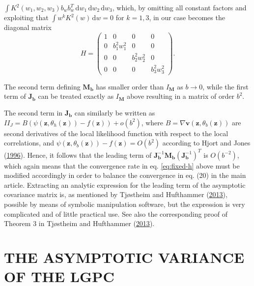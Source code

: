 \documentclass[
  12pt,
  letterpaper]{article}
\numberwithin{equation}{section}
\newcommand{\z}{\bm{z}}
\newcommand{\fv}{\bm{v}}
\newcommand{\hh}{\bm{b}}
\newcommand{\Jb}{\bm{J}_{\hh}}
\newcommand{\Mb}{\bm{M}_{\hh}}
\begin{document}
\noindent \(\int K^2(w_1, w_2, w_3)b_wb_w^T\,\textrm{d}w_1\,\textrm{d}w_2\,\textrm{d}w_3\), which, by omitting all constant factors and exploiting that \(\int w^k K^2(w)\,\textrm{d}w = 0\) for \(k = 1,3\), in our case becomes the diagonal matrix
\[H = \begin{pmatrix} 1 & 0 & 0 & 0 \\ 0 & b_1^2w_1^2 & 0 & 0 \\ 0 & 0 & b_2^2w_2^2 & 0 \\ 0 & 0 & 0 & b_3^2w_3^2 \end{pmatrix}.\]

The second term defining \(\Mb\) has smaller order than \(I_{\bm{M}}\) as \(b \rightarrow 0\), while the first term of \(\Jb\) can be treated exactly as \(I_{\bm{M}}\) above resulting in a matrix of order \(b^2\).

The second term in \(\Jb\) can similarly be written as \(II_J = B(\psi(\z, \theta_h(\z)) - f(\z)) + o(b^2)\), where \(B = \nabla \fv(\z, \theta_b(\z))\) are second derivatives of the local likelihood function with respect to the local correlations, and \(\psi(\z, \theta_b(\z)) - f(\z) = O(b^2)\) according to Hjort and Jones (\protect\hyperlink{ref-hjort1996locally}{1996}). Hence, it follows that the leading term of \(\Jb^{-1}\Mb(\Jb^{-1})^T\) is \(O(b^{-2})\), which again means that the convergence rate in eq. \eqref{eq:fixed-h} above must be modified accordingly in order to balance the convergence in eq. (20) in the main article. Extracting an analytic expression for the leading term of the asymptotic covariance matrix is, as mentioned by Tjøstheim and Hufthammer (\protect\hyperlink{ref-tjostheim2013local}{2013}), possible by means of symbolic manipulation software, but the expression is very complicated and of little practical use. See also the corresponding proof of Theorem 3 in Tjøstheim and Hufthammer (\protect\hyperlink{ref-tjostheim2013local}{2013}).

\hypertarget{app-asvar}{%
\section{THE ASYMPTOTIC VARIANCE OF THE LGPC}\label{app-asvar}}
\end{document}
